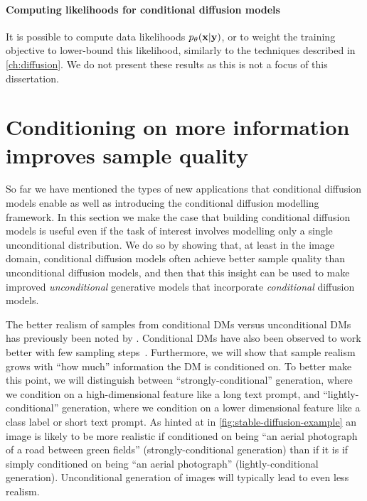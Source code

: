\paragraph{Computing likelihoods for conditional diffusion models}
It is possible to compute data likelihoods $p_\theta({\mathbf{x}}|{\mathbf{y}})$, or to weight the training objective to lower-bound this likelihood, similarly to the techniques described in \cref{ch:diffusion}. We do not present these results as this is not a focus of this dissertation.

\section{Conditioning on more information improves sample quality} \label{sec:conditioning-on-more-improves-performance}

So far we have mentioned the types of new applications that conditional diffusion models enable as well as introducing the conditional diffusion modelling framework. In this section we make the case that building conditional diffusion models is useful even if the task of interest involves modelling only a single unconditional distribution. We do so by showing that, at least in the image domain, conditional diffusion models often achieve better sample quality than unconditional diffusion models, and then that this insight can be used to make improved \textit{unconditional} generative models that incorporate \textit{conditional} diffusion models.

The better realism of samples from conditional DMs versus unconditional DMs has previously been noted by \citet{ho2022classifier,bao2022conditional,hu2022self}. Conditional DMs have also been observed to work better with few sampling steps~\citep{meng2022distillation}. Furthermore, we will show that sample realism grows with ``how much'' information the DM is conditioned on. To better make this point, we will distinguish between ``strongly-conditional'' generation, where we condition on a high-dimensional feature like a long text prompt, and ``lightly-conditional'' generation, where we condition on a lower dimensional feature like a class label or short text prompt.  As hinted at in \cref{fig:stable-diffusion-example} an image is likely to be more realistic if conditioned on being ``an aerial photograph of a road between green fields'' (strongly-conditional generation) than if it is if simply conditioned on being ``an aerial photograph'' (lightly-conditional generation). Unconditional generation of images will typically lead to even less realism.


